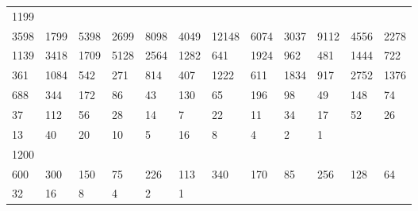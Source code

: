\begin{longtable}{llllllllllll}
1199&&&&&&&&&&&\\
3598& 1799& 5398& 2699& 8098& 4049& 12148& 6074& 3037& 9112& 4556& 2278\\
1139& 3418& 1709& 5128& 2564& 1282& 641& 1924& 962& 481& 1444& 722\\
361& 1084& 542& 271& 814& 407& 1222& 611& 1834& 917& 2752& 1376\\
688& 344& 172& 86& 43& 130& 65& 196& 98& 49& 148& 74\\
37& 112& 56& 28& 14& 7& 22& 11& 34& 17& 52& 26\\
13& 40& 20& 10& 5& 16& 8& 4& 2& 1& \\

1200&&&&&&&&&&&\\
600& 300& 150& 75& 226& 113& 340& 170& 85& 256& 128& 64\\
32& 16& 8& 4& 2& 1& \\
\bottomrule\end{longtable}
